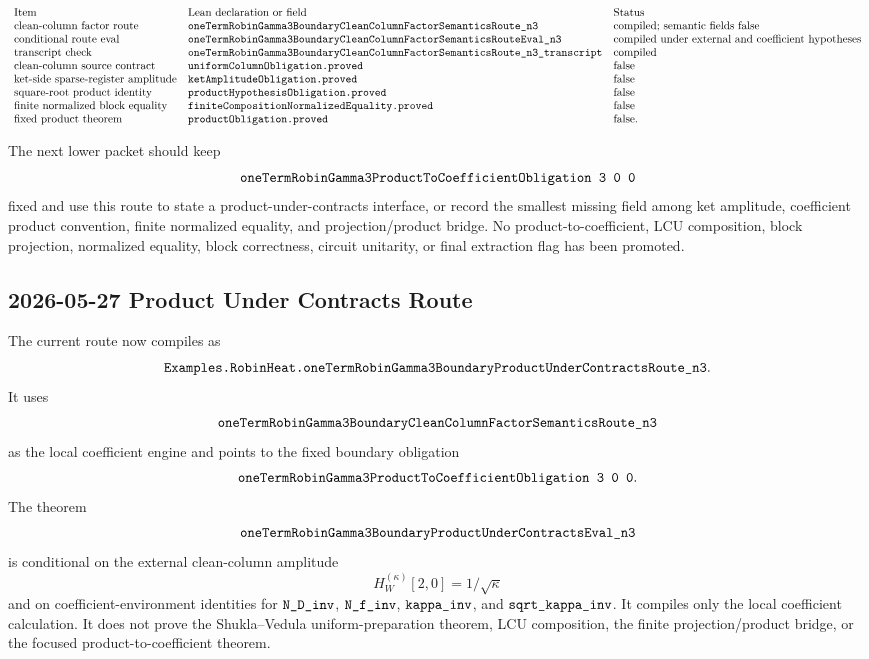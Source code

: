 \[
\begin{array}{lll}
\text{Item} & \text{Lean declaration or field} & \text{Status}\\
\text{clean-column factor route} &
\texttt{oneTermRobinGamma3BoundaryCleanColumnFactorSemanticsRoute\_n3} &
\text{compiled; semantic fields false}\\
\text{conditional route eval} &
\texttt{oneTermRobinGamma3BoundaryCleanColumnFactorSemanticsRouteEval\_n3} &
\text{compiled under external and coefficient hypotheses}\\
\text{transcript check} &
\texttt{oneTermRobinGamma3BoundaryCleanColumnFactorSemanticsRoute\_n3\_transcript} &
\text{compiled}\\
\text{clean-column source contract} &
\texttt{uniformColumnObligation.proved} & \text{false}\\
\text{ket-side sparse-register amplitude} &
\texttt{ketAmplitudeObligation.proved} & \text{false}\\
\text{square-root product identity} &
\texttt{productHypothesisObligation.proved} & \text{false}\\
\text{finite normalized block equality} &
\texttt{finiteCompositionNormalizedEquality.proved} & \text{false}\\
\text{fixed product theorem} &
\texttt{productObligation.proved} & \text{false}.
\end{array}
\]

The next lower packet should keep
\[
  \Lean{oneTermRobinGamma3ProductToCoefficientObligation\ 3\ 0\ 0}
\]
fixed and use this route to state a product-under-contracts interface, or
record the smallest missing field among ket amplitude, coefficient product
convention, finite normalized equality, and projection/product bridge.  No
product-to-coefficient, LCU composition, block projection, normalized equality,
block correctness, circuit unitarity, or final extraction flag has been
promoted.

\subsection{2026-05-27 Product Under Contracts Route}

The current route now compiles as
\[
  \texttt{Examples.RobinHeat.oneTermRobinGamma3BoundaryProductUnderContractsRoute\_n3}.
\]
It uses
\[
  \texttt{oneTermRobinGamma3BoundaryCleanColumnFactorSemanticsRoute\_n3}
\]
as the local coefficient engine and points to the fixed boundary obligation
\[
  \Lean{oneTermRobinGamma3ProductToCoefficientObligation\ 3\ 0\ 0}.
\]
The theorem
\[
  \texttt{oneTermRobinGamma3BoundaryProductUnderContractsEval\_n3}
\]
is conditional on the external clean-column amplitude
\[
  H_W^{(\kappa)}[2,0] = 1/\sqrt{\kappa}
\]
and on coefficient-environment identities for \(\texttt{N\_D\_inv}\),
\(\texttt{N\_f\_inv}\), \(\texttt{kappa\_inv}\), and
\(\texttt{sqrt\_kappa\_inv}\).  It compiles only the local coefficient
calculation.  It does not prove the Shukla--Vedula uniform-preparation
theorem, LCU composition, the finite projection/product bridge, or the focused
product-to-coefficient theorem.

